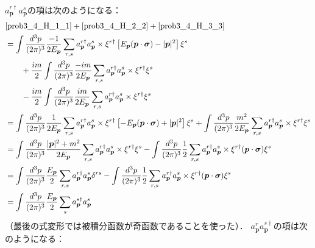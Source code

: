 $a_{\boldsymbol{p}}^{r\dagger} a_{\boldsymbol{p}}^{s}$の項は次のようになる：
\begin{align}
  & \eqref{prob3_4_H_1_1} + \eqref{prob3_4_H_2_2} + \eqref{prob3_4_H_3_3} \notag \\
  & = \int \frac{d^3p}{(2\pi)^3} \frac{-1}{2E_{\boldsymbol{p}}} \sum_{r, s} a_{\boldsymbol{p}}^{r\dagger} a_{\boldsymbol{p}}^s
  \times \xi^{r\dagger} \left [E_{\boldsymbol{p}} (\boldsymbol{p} \cdot \boldsymbol{\sigma}) - \lvert \boldsymbol{p} \rvert^2 \right ] \xi^s \notag \\
  & \qquad + \frac{im}{2} \int \frac{d^3p}{(2\pi)^3} \frac{-im}{2E_{\boldsymbol{p}}}
  \sum_{r, s} a_{\boldsymbol{p}}^{r\dagger} a_{\boldsymbol{p}}^{s} \times \xi^{r\dagger} \xi^s \notag \\
  & \qquad - \frac{im}{2}\int \frac{d^3p}{(2\pi)^3} \frac{im}{2E_{\boldsymbol{p}}} \sum_{r, s} a_{\boldsymbol{p}}^{r\dagger} a_{\boldsymbol{p}}^s \times \xi^{r\dagger} \xi^s \notag \\
  & = \int \frac{d^3p}{(2\pi)^3} \frac{1}{2E_{\boldsymbol{p}}} \sum_{r, s} a_{\boldsymbol{p}}^{r\dagger} a_{\boldsymbol{p}}^s
  \times \xi^{r\dagger} \left [ - E_{\boldsymbol{p}} (\boldsymbol{p} \cdot \boldsymbol{\sigma}) + \lvert \boldsymbol{p} \rvert^2 \right ] \xi^s + \int \frac{d^3p}{(2\pi)^3} \frac{m^2}{2E_{\boldsymbol{p}}}
  \sum_{r, s} a_{\boldsymbol{p}}^{r\dagger} a_{\boldsymbol{p}}^{s} \times \xi^{r\dagger} \xi^s \notag \\
  & = \int \frac{d^3p}{(2\pi)^3} \frac{\lvert \boldsymbol{p} \rvert^2 + m^2}{2E_{\boldsymbol{p}}}
  \sum_{r, s} a_{\boldsymbol{p}}^{r\dagger} a_{\boldsymbol{p}}^s \times \xi^{r\dagger} \xi^s - \int \frac{d^3p}{(2\pi)^3} \frac{1}{2}
  \sum_{r, s} a_{\boldsymbol{p}}^{r\dagger} a_{\boldsymbol{p}}^{s} \times \xi^{r\dagger} (\boldsymbol{p} \cdot \boldsymbol{\sigma}) \xi^s \notag \\
  & = \int \frac{d^3p}{(2\pi)^3} \frac{E_{\boldsymbol{p}}}{2} \sum_{r, s} a_{\boldsymbol{p}}^{r\dagger} a_{\boldsymbol{p}}^s \delta^{rs} - \int \frac{d^3p}{(2\pi)^3} \frac{1}{2}
  \sum_{r, s} a_{\boldsymbol{p}}^{r\dagger} a_{\boldsymbol{p}}^{s} \times \xi^{r\dagger} (\boldsymbol{p} \cdot \boldsymbol{\sigma}) \xi^s \notag \\
  & = \int \frac{d^3p}{(2\pi)^3} \frac{E_{\boldsymbol{p}}}{2} \sum_{s} a_{\boldsymbol{p}}^{s\dagger} a_{\boldsymbol{p}}^s \label{prob3_4_ca}
\end{align}
（最後の式変形では被積分函数が奇函数であることを使った）．
$a_{\boldsymbol{p}}^{r} a_{\boldsymbol{p}}^{s\dagger}$の項は次のようになる：
